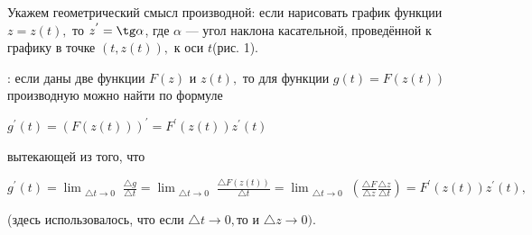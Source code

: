 \documentclass[10pt]{article}
\begin{document}
Укажем геометрический смысл производной: если нарисовать график функции \begin{math} z=z(t),\end{math} то \begin{math} z^{'}=\tg\alpha \end{math}, где \begin{math} \alpha \end{math} — угол наклона касательной, проведённой к графику в точке \begin{math} (t, z(t)), \end{math} к оси \begin{math} t \end{math}(рис. 1). 
 
: если даны две функции \begin{math} F(z) \end{math} и \begin{math} z(t), \end{math} то для функции \begin{math} g(t)=F(z(t)) \end{math} производную можно найти по формуле 
 
\begin{center} 
    \begin{math} 
        g^{'}(t) = (F(z(t)))^{'} = F^{'}(z(t))z^{'}(t) 
     \end{math} 
\end{center} 
 
\begin{flushleft} вытекающей из того, что \end{flushleft} 
 
\begin{center} 
    \begin{math} 
        g^{'}(t)=\lim_{\substack{\triangle t\rightarrow 0}} \frac{\triangle g}{\triangle t} = \lim_{\substack{\triangle t\rightarrow 0}} \frac{\triangle F(z(t))}{\triangle t} = \lim_{\substack{\triangle t\rightarrow 0}} (\frac{\triangle F}{\triangle z} \frac{\triangle z}{\triangle t}) = F^{'}(z(t))z^{'}(t), 
     \end{math} 
\end{center} 
(здесь использовалось, что если \begin{math}\triangle t \rightarrow 0,\end{math}то и \begin{math} \triangle z \rightarrow 0).\end{math} 
 
\end{document}
